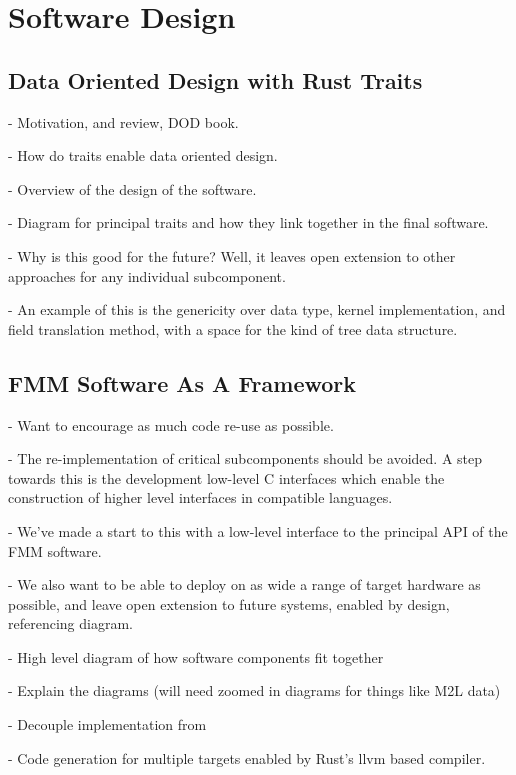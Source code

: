 \chapter{Software Design}\label{chpt:software_design}
\thispagestyle{chaptertitle} %


\section{Data Oriented Design with Rust Traits}

- Motivation, and review, DOD book.

- How do traits enable data oriented design.

- Overview of the design of the software.

- Diagram for principal traits and how they link together in the final software.

- Why is this good for the future? Well, it leaves open extension to other approaches for any individual subcomponent.

- An example of this is the genericity over data type, kernel implementation, and field translation method, with a space for the kind of tree data structure.

\section{FMM Software As A Framework}

- Want to encourage as much code re-use as possible.

- The re-implementation of critical subcomponents should be avoided. A step towards this is the development low-level C interfaces which enable the construction of higher level interfaces in compatible languages.

- We've made a start to this with a low-level interface to the principal API of the FMM software.


- We also want to be able to deploy on as wide a range of target hardware as possible, and leave open extension to future systems, enabled by design, referencing diagram.

- High level diagram of how software components fit together

- Explain the diagrams (will need zoomed in diagrams for things like M2L data)

- Decouple implementation from

- Code generation for multiple targets enabled by Rust's llvm based compiler.

